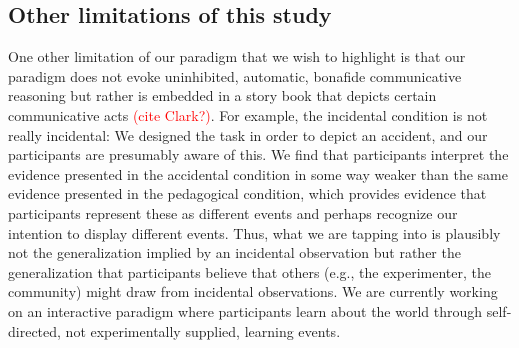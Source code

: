 \documentclass[10pt,letterpaper]{article}
\newcommand{\red}[1]{\textcolor{Red}{#1}}
\begin{document}
\subsection{Other limitations of this study}

One other limitation of our paradigm that we wish to highlight is that our paradigm does not evoke uninhibited, automatic, bonafide communicative reasoning but rather is embedded in a story book that depicts certain communicative acts \red{(cite Clark?)}. 
For example, the incidental condition is not really incidental: We designed the task in order to depict an accident, and our participants are presumably aware of this. 
We find that participants interpret the evidence presented in the accidental condition in some way weaker than the same evidence presented in the pedagogical condition, which provides evidence that participants represent these as different events and perhaps recognize our intention to display different events. Thus, what we are tapping into is plausibly not the generalization implied by an incidental observation but rather the generalization that participants believe that others (e.g., the experimenter, the community) might draw from incidental observations. 
We are currently working on an interactive paradigm where participants learn about the world through self-directed, not experimentally supplied, learning events. 






\setlength{\bibleftmargin}{.125in}
\setlength{\bibindent}{-\bibleftmargin}


\end{document}
